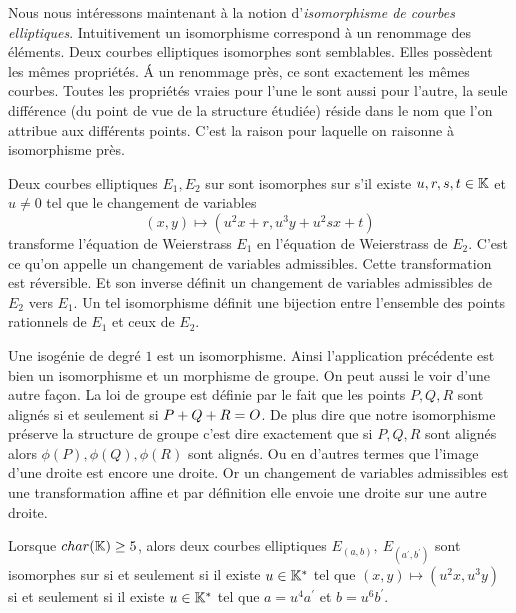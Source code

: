
Nous nous intéressons maintenant à la notion d'\emph{isomorphisme de courbes elliptiques}. Intuitivement un isomorphisme correspond à un renommage des éléments. Deux courbes elliptiques isomorphes sont semblables. Elles possèdent les mêmes propriétés. \'A un renommage près, ce sont exactement les mêmes courbes. Toutes les propriétés vraies pour l'une le sont aussi pour l'autre, la seule différence (du point de vue de la structure étudiée) réside dans le nom que l'on attribue aux différents points. C'est la raison pour laquelle on raisonne à isomorphisme près.

\begin{definition}
Deux courbes elliptiques $E_1, E_2$ sur \field{} sont isomorphes sur \field{} s'il existe $u, r, s, t \in \mathbb{K}{}$ et $u \ne 0$ tel que le changement de variables 
\begin{equation*}
    (x, y) \mapsto (u^2x + r, u^3y + u^2sx + t)
\end{equation*}
transforme l'équation de Weierstrass $E_1$ en l'équation de Weierstrass de $E_2$. C'est ce qu'on appelle un changement de variables admissibles. Cette transformation est réversible. Et son inverse définit un changement de variables admissibles de $E_2$ vers $E_1$. Un tel isomorphisme définit une bijection entre l'ensemble des points rationnels de $E_1$ et ceux de $E_2$.
\end{definition}

Une isogénie de degré $1$ est un isomorphisme. Ainsi l'application précédente est bien un isomorphisme et un morphisme de groupe. On peut aussi le voir d'une autre façon. La loi de groupe est définie par le fait que les points $P, Q, R$ sont alignés si et seulement si $P + Q + R = O{}$. De plus dire que notre isomorphisme préserve la structure de groupe c'est dire exactement que si $P, Q, R$ sont alignés alors $\phi(P), \phi(Q), \phi(R)$ sont alignés. Ou en d'autres termes que l'image d'une droite est encore une droite. Or un changement de variables admissibles est une transformation affine et par définition elle envoie une droite sur une autre droite.

\vspace{0.2cm}

\begin{propriete}
Lorsque $char(\mathbb{K}{}) \geq 5$, alors deux courbes elliptiques $E_{(a, b)},\ E_{(a^{'}, b^{'})}$ sont isomorphes sur \field{} si et seulement si il existe $u \in \mathbb{K}{}^{*}$ tel que $(x, y) \mapsto (u^2x, u^3y)$ si et seulement si il existe $u \in \mathbb{K}{}^{*}$ tel que $a = u^4 a^{'}$ et $b = u^6 b^{'}$.
\end{propriete}

